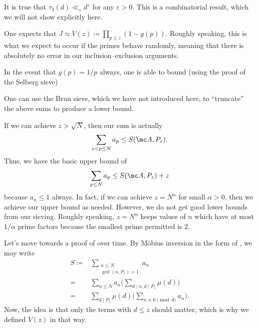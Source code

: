 \documentclass[../notes.tex]{subfiles}
\begin{document}
\begin{remark}
	It is true that $\tau_3(d)\ll_\varepsilon d^\varepsilon$ for any $\varepsilon>0$. This is a combinatorial result, which we will not show explicitly here.
\end{remark}
\begin{remark}
	One expects that $J\approx V(z)\coloneqq\prod_{p\le z}(1-g(p))$. Roughly speaking, this is what we expect to occur if the primes behave randomly, meaning that there is absolutely no error in our inclusion--exclusion arguments.
\end{remark}
\begin{remark}
	In the event that $g(p)=1/p$ always, one is able to bound (using the proof of the Selberg sieve)
\end{remark}
\begin{remark}
	One can use the Brun sieve, which we have not introduced here, to ``truncate'' the above sums to produce a lower bound.
\end{remark}
\begin{remark}
	If we can achieve $z>\sqrt N$, then our sum is actually
	\[\sum_{z<p\le N}a_p\le S(\mc A,P_z).\]
	Thus, we have the basic upper bound of
	\[\sum_{p\le N}a_p\le S(\mc A,P_z)+z\]
	because $a_n\le1$ always. In fact, if we can achieve $z=N^\alpha$ for small $\alpha>0$, then we achieve our upper bound as needed. However, we do not get good lower bounds from our sieving. Roughly speaking, $z=N^\alpha$ keeps values of $n$ which have at most $1/\alpha$ prime factors because the smallest prime permitted is $2$.
\end{remark}
Let's move towards a proof of  over time. By M\"obius inversion in the form of , we may write
\begin{align*}
	S\coloneqq{}& \sum_{\substack{n\le N\\\gcd(n,P_z)=1}}a_n \\
	={}& \sum_{n\le N}a_n\Bigg(\sum_{d\mid n,d\mid P_z}\mu(d)\Bigg) \\
	={}& \sum_{d\mid P_z}\mu(d)\Bigg(\sum_{n\equiv0\pmod d}a_n\Bigg).
\end{align*}
Now, the idea is that only the terms with $d\le z$ should matter, which is why we defined $V(z)$ in that way.
\end{document}
